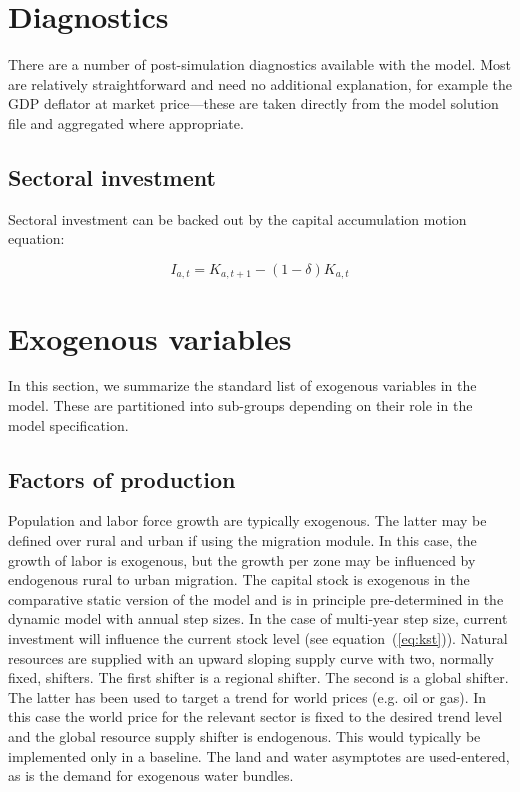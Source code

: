 \documentclass[11pt,letterpaper]{report}
\begin{document}
\section{Diagnostics}

There are a number of post-simulation diagnostics available with the model. Most
are relatively straightforward and need no additional explanation, for example
the GDP deflator at market price---these are taken directly from the model
solution file and aggregated where appropriate.

\subsection{Sectoral investment}

Sectoral investment can be backed out by the capital accumulation motion
equation:

\[
I_{a,t} = K_{a,t+1} - (1-\delta)K_{a,t}
\]

\section{Exogenous variables}

In this section, we summarize the standard list of
exogenous variables in the model. These are partitioned
into sub-groups depending on their role in the model
specification.

\subsection{Factors of production}

Population and labor force growth are typically exogenous. The latter
may be defined over rural and urban if using the migration module. In
this case, the growth of labor is exogenous, but the growth per zone
may be influenced by endogenous rural to urban migration. The capital
stock is exogenous in the comparative static version of the model
and is in principle pre-determined in the dynamic model with annual
step sizes. In the case of multi-year step size, current investment
will influence the current stock level (see equation~(\ref{eq:kst})).
Natural resources are supplied with an upward sloping supply curve
with two, normally fixed, shifters. The first shifter is a regional
shifter. The second is a global shifter. The latter has been used to
target a trend for world prices (e.g. oil or gas). In this case
the world price for the relevant sector is fixed to the desired
trend level and the global resource supply shifter is endogenous. This
would typically be implemented only in a baseline. The land
and water asymptotes are used-entered, as is the demand for
exogenous water bundles.
\end{document}
